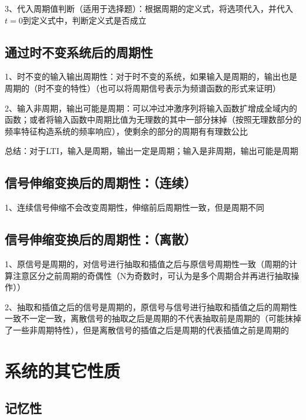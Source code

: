 3、代入周期值判断（适用于选择题）：根据周期的定义式，将选项代入，并代入$t=0$到定义式中，判断定义式是否成立



\subsection{通过时不变系统后的周期性}

1、时不变的输入输出周期性：对于时不变的系统，如果输入是周期的，输出也是周期的（时不变的特性）（也可以将周期信号表示为频谱函数的形式来证明）

2、输入非周期，输出可能是周期：可以冲过冲激序列将输入函数扩增成全域内的函数；或者将输入函数中周期比值为无理数的其中一部分抹掉（按照无理数部分的频率特征构造系统的频率响应），使剩余的部分的周期有有理数公比

总结：对于LTI，输入是周期，输出一定是周期；输入是非周期，输出可能是周期



\subsection{信号伸缩变换后的周期性：（连续）}

1、连续信号伸缩不会改变周期性，伸缩前后周期性一致，但是周期不同



\subsection{信号伸缩变换后的周期性：（离散）}

1、原信号是周期的，对信号进行抽取和插值之后与原信号周期性一致（周期的计算注意区分之前周期的奇偶性（N为奇数时，可认为是多个周期合并再进行抽取操作））

2、抽取和插值之后的信号是周期的，原信号与信号进行抽取和插值之后的周期性一致不一定一致，离散信号的抽取之后是周期的不代表抽取前是周期的（可能抹掉了一些非周期特性），但是离散信号的插值之后是周期的代表插值之前是周期的

\section{系统的其它性质}



\subsection{记忆性}

